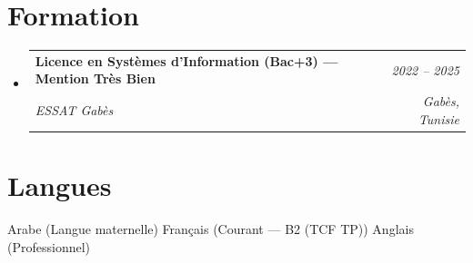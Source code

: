 \documentclass[letterpaper,9pt]{article}
\makeatletter
\newcommand{\resumeSubheading}[4]{
  \vspace{-1pt}\item
  \begin{tabular*}{0.97\textwidth}[t]{l@{\extracolsep{\fill}}r}
    \textbf{#1} & \textit{\color{greytext}#2} \\
    \textit{\small\color{greytext} #3} & \textit{\small\color{greytext} #4}
  \end{tabular*}\vspace{-2pt}
}
\newcommand{\resumeSubHeadingListStart}{\begin{itemize}[leftmargin=0.18in, label={}, itemsep=1.2pt, topsep=2.5pt, parsep=0pt]}
\newcommand{\resumeSubHeadingListEnd}{\end{itemize}\vspace{-2pt}}
\makeatother
\begin{document}
\section{Formation}
\resumeSubHeadingListStart
  \resumeSubheading{Licence en Systèmes d'Information (Bac+3) --- Mention Très Bien}{2022 -- 2025}{ESSAT Gabès}{Gabès, Tunisie}
\resumeSubHeadingListEnd\vspace{-1pt}

\section{Langues}
\begin{itemize}[leftmargin=0.18in, label={}, topsep=2pt, itemsep=1pt, parsep=0pt]
\footnotesize{
  \item Arabe (Langue maternelle) \textperiodcentered{} Français (Courant --- B2 (TCF TP)) \textperiodcentered{} Anglais (Professionnel)
}
\end{itemize}
\end{document}
